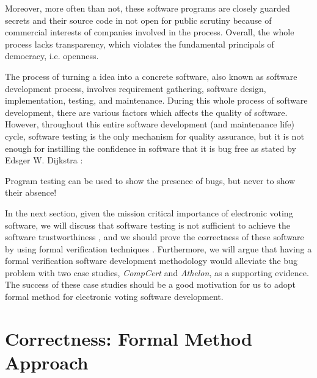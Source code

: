    \noindent 
   Moreover, more often than not, these software programs
   are closely guarded secrets and their source 
   code in not open for public scrutiny because of commercial 
   interests of companies \citep{AEC:2013:LMM} involved in the 
   process.  Overall, the whole process lacks transparency, which 
   violates the fundamental principals of democracy, i.e. openness. 
  
   The process  of turning a  idea into a 
   concrete software, also known as software development process, involves 
   requirement gathering, software design, implementation, testing, and maintenance. 
   During this whole process of software development, there are various factors 
   which affects the quality of software.  However, 
   throughout this entire software development (and maintenance life) cycle,
   software testing is the only mechanism for quality assurance, but
   it is not enough for 
   instilling the confidence in software that it is bug free 
   as stated by Edsger W. Dijkstra \citep{Dijkstra:1972:HP:355604.361591}:
   \begin{displayquote}
   Program testing can be used to show the presence of bugs, 
    but never to show their absence!
   \end{displayquote}
  
   
   In the next section, given the mission critical importance of electronic voting software, 
   we will discuss that software testing 
   is not sufficient to achieve the software trustworthiness \citep{10.1007/978-3-642-35795-4_5},  and we should 
   prove the  correctness of these software
   by using formal verification techniques \citep{BECKERT2014115}.
   Furthermore, we will argue that  having a formal verification software development methodology \citep{10.1007/978-3-319-95582-7_38}
    would alleviate 
	the bug problem with two case studies, \textit{CompCert} \citep{DBLP:conf/popl/Leroy06} and \textit{Athelon}, as a supporting evidence. The success of these 
	case studies should be a good motivation for us to adopt formal method for electronic voting software development. 
   
   
   \section{Correctness: Formal Method Approach}
   \label{secback:correctness_formal}

